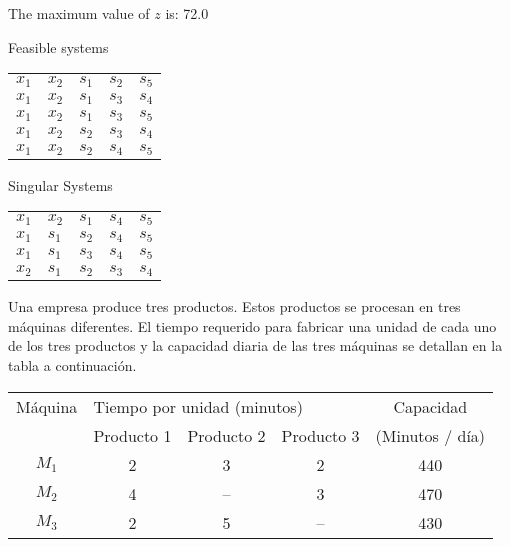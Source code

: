 \documentclass[spanish,letterpaper,11pt]{exam}
\begin{document}
\begin{questions}
\begin{solution}
The maximum value of $z$ is: 72.0

Feasible systems

{
  \centering
  \begin{tabular}{lllll}
    \toprule
     $x_1$ & $x_2$ & $s_1$ & $s_2$ & $s_5$ \\
     $x_1$ & $x_2$ & $s_1$ & $s_3$ & $s_4$ \\
     $x_1$ & $x_2$ & $s_1$ & $s_3$ & $s_5$ \\
     $x_1$ & $x_2$ & $s_2$ & $s_3$ & $s_4$ \\
     $x_1$ & $x_2$ & $s_2$ & $s_4$ & $s_5$ \\
    \bottomrule
    \end{tabular}
  \par
}

Singular Systems

{
  \centering
  \begin{tabular}{lllll}
    \toprule
     $x_1$ & $x_2$ & $s_1$ & $s_4$ & $s_5$ \\
     $x_1$ & $s_1$ & $s_2$ & $s_4$ & $s_5$ \\
     $x_1$ & $s_1$ & $s_3$ & $s_4$ & $s_5$ \\
     $x_2$ & $s_1$ & $s_2$ & $s_3$ & $s_4$ \\
    \bottomrule
    \end{tabular}
  \par
}

    \end{solution}

    \vspace{1cm}
    \question
  Una empresa produce tres productos. Estos productos se procesan en tres máquinas diferentes. El tiempo requerido para fabricar una unidad de cada uno de los tres productos y la capacidad diaria de las tres máquinas se detallan en la tabla a continuación.

  {\centering
      \begin{tabular}{ccccc}
        \toprule
        Máquina & \multicolumn{3}{l}{Tiempo por unidad (minutos)} & Capacidad       \\
                &  Producto 1             &    Producto 2            &     Producto 3           & (Minutos / día) \\
        \midrule
        $M_1$   & 2             & 3              & 2              & 440             \\
        $M_2$   & 4             & --             & 3              & 470             \\
        $M_3$   & 2             & 5              & --             & 430\\
        \bottomrule
      \end{tabular}
    \par}
  


\end{questions}
\end{document}

